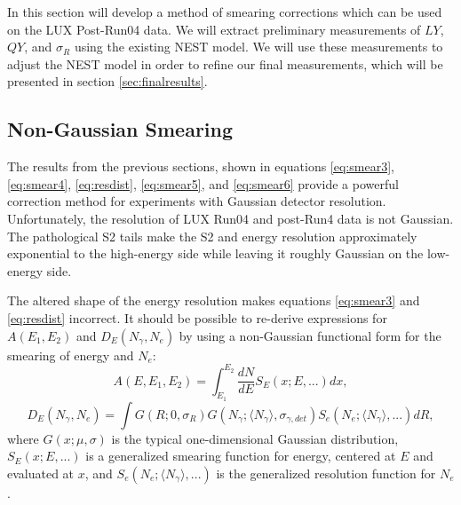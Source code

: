 In this section will develop a method of smearing corrections which can be used on the LUX Post-Run04 data. We will extract preliminary measurements of $LY$, $QY$, and $\sigma_R$ using the existing NEST model. We will use these measurements to adjust the NEST model in order to refine our final measurements, which will be presented in section \ref{sec:finalresults}. 

\subsection{Non-Gaussian Smearing}
The results from the previous sections, shown in equations \ref{eq:smear3}, \ref{eq:smear4}, \ref{eq:resdist}, \ref{eq:smear5}, and \ref{eq:smear6} provide a powerful correction method for experiments with Gaussian detector resolution. Unfortunately, the resolution of LUX Run04 and post-Run4 data is not Gaussian. The pathological S2 tails make the S2 and energy resolution approximately exponential to the high-energy side while leaving it roughly Gaussian on the low-energy side. 

The altered shape of the energy resolution makes equations \ref{eq:smear3} and \ref{eq:resdist} incorrect. It should be possible to re-derive expressions for $A(E_1,E_2)$ and $D_E(N_{\gamma},N_{e})$ by using a non-Gaussian functional form for the smearing of energy and $N_e$:
\begin{equation}
A(E,E_1,E_2)=\int_{E_1}^{E_2}\frac{dN}{dE}S_E(x;E,...)dx,
\end{equation}
\begin{equation}
D_E(N_{\gamma},N_{e})= \int G(R;0,\sigma_R)G(N_{\gamma};\langle N_{\gamma} \rangle,\sigma_{\gamma,det})S_e(N_e;\langle N_{\gamma} \rangle,...)dR,
\end{equation}
where $G(x;\mu,\sigma)$ is the typical one-dimensional Gaussian distribution, $S_E(x;E,...)$ is a generalized smearing function for energy, centered at $E$ and evaluated at $x$, and $S_e(N_e;\langle N_{\gamma} \rangle,...)$ is the generalized resolution function for $N_e$.


